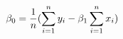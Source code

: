 \documentclass[preview]{standalone}
\begin{document}
\begin{align*}
\special{dvisvgm:raw <g id='unique000'>}\beta_0=\frac{1}{n}(\sum_{i=1}^n{y_i}-\beta_1\sum_{i=1}^n{x_i})\special{dvisvgm:raw </g>}
\end{align*}
\end{document}
